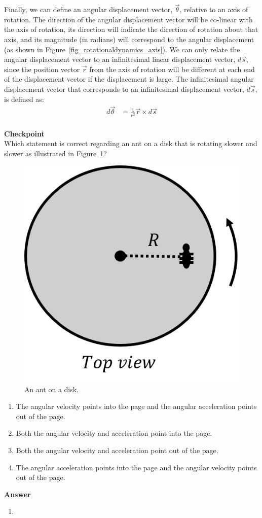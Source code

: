 Finally, we can define an angular displacement vector, $\vec \theta$, relative to an axis of rotation. The direction of the angular displacement vector will be co-linear with the axis of rotation, its direction will indicate the direction of rotation about that axis, and its magnitude (in radians) will correspond to the angular displacement (as shown in Figure~\ref{fig_rotationaldynamics_axis}). We can only relate the angular displacement vector to an infinitesimal linear displacement vector, $d\vec s$, since the position vector $\vec r$ from the axis of rotation will be different at each end of the displacement vector if the displacement is large. The infinitesimal angular displacement vector that corresponds to an infinitesimal displacement vector, $d\vec s$, is defined as:
\begin{align*}
d\vec \theta &= \frac{1}{r^2} \vec r \times d\vec s\\
\end{align*}

\begin{framed}
\textbf{Checkpoint}\\
Which statement is correct regarding an ant on a disk that is rotating slower and slower as illustrated in Figure~\ref{fig:rotationaldynamics:ant}?

\begin{figure}[!htbp]
\centering
\includegraphics[width=0.375\linewidth]{files/ant-462cf685aaf5841e43d592702e783193.png}
\caption[]{An ant on a disk.}
\label{fig:rotationaldynamics:ant}
\end{figure}

\begin{enumerate}
\item The angular velocity points into the page and the angular acceleration points out of the page.
\item Both the angular velocity and acceleration point into the page.
\item Both the angular velocity and acceleration point out of the page.
\item The angular acceleration points into the page and the angular velocity points out of the page.
\end{enumerate}

\begin{framed}
\textbf{Answer}\\
\begin{enumerate}[resume]
\item
\end{enumerate}
\end{framed}
\end{framed}

